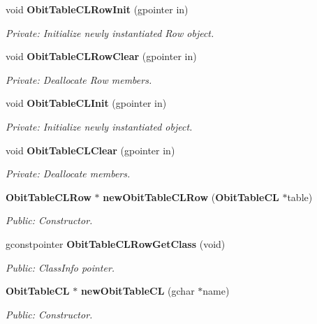 \begin{CompactItemize}
\item 
void {\bf Obit\-Table\-CLRow\-Init} (gpointer in)
\begin{CompactList}\small\item\em Private: Initialize newly instantiated Row object. \item\end{CompactList}\item 
void {\bf Obit\-Table\-CLRow\-Clear} (gpointer in)
\begin{CompactList}\small\item\em Private: Deallocate Row members. \item\end{CompactList}\item 
void {\bf Obit\-Table\-CLInit} (gpointer in)
\begin{CompactList}\small\item\em Private: Initialize newly instantiated object. \item\end{CompactList}\item 
void {\bf Obit\-Table\-CLClear} (gpointer in)
\begin{CompactList}\small\item\em Private: Deallocate members. \item\end{CompactList}\item 
{\bf Obit\-Table\-CLRow} $\ast$ {\bf new\-Obit\-Table\-CLRow} ({\bf Obit\-Table\-CL} $\ast$table)
\begin{CompactList}\small\item\em Public: Constructor. \item\end{CompactList}\item 
gconstpointer {\bf Obit\-Table\-CLRow\-Get\-Class} (void)
\begin{CompactList}\small\item\em Public: Class\-Info pointer. \item\end{CompactList}\item 
{\bf Obit\-Table\-CL} $\ast$ {\bf new\-Obit\-Table\-CL} (gchar $\ast$name)
\begin{CompactList}\small\item\em Public: Constructor. \item\end{CompactList}\item 

\end{CompactItemize}
